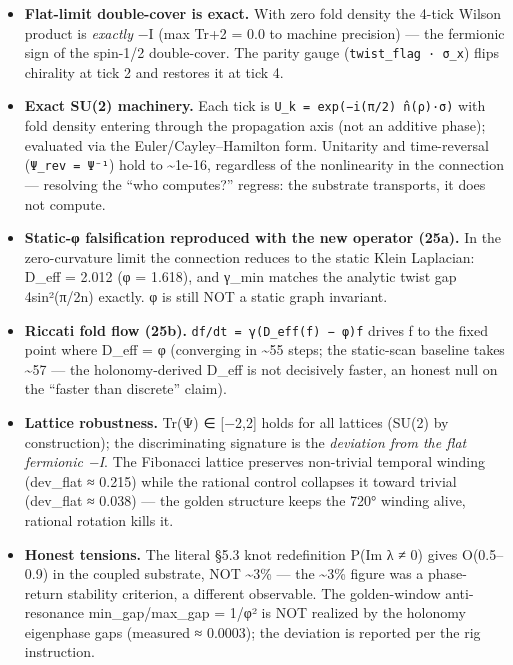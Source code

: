 \documentclass[
]{article}
\providecommand{\tightlist}{%
  \setlength{\itemsep}{0pt}\setlength{\parskip}{0pt}}
\begin{document}
\begin{itemize}
\tightlist
\item
  \textbf{Flat-limit double-cover is exact.} With zero fold density the
  4-tick Wilson product is \emph{exactly} −I (max
  \textbar Tr+2\textbar{} = 0.0 to machine precision) --- the fermionic
  sign of the spin-1/2 double-cover. The parity gauge
  (\texttt{twist\_flag\ ·\ σ\_x}) flips chirality at tick 2 and restores
  it at tick 4.
\item
  \textbf{Exact SU(2) machinery.} Each tick is
  \texttt{U\_k\ =\ exp(−i(π/2)\ n̂(ρ)·σ)} with fold density entering
  through the propagation axis (not an additive phase); evaluated via
  the Euler/Cayley--Hamilton form. Unitarity and time-reversal
  (\texttt{Ψ\_rev\ =\ Ψ⁻¹}) hold to \textasciitilde1e-16, regardless of
  the nonlinearity in the connection --- resolving the ``who computes?''
  regress: the substrate transports, it does not compute.
\item
  \textbf{Static-φ falsification reproduced with the new operator
  (25a).} In the zero-curvature limit the connection reduces to the
  static Klein Laplacian: D\_eff = 2.012 (φ = 1.618), and γ\_min matches
  the analytic twist gap 4sin²(π/2n) exactly. φ is still NOT a static
  graph invariant.
\item
  \textbf{Riccati fold flow (25b).}
  \texttt{df/dt\ =\ γ(D\_eff(f)\ −\ φ)f} drives f to the fixed point
  where D\_eff = φ (converging in \textasciitilde55 steps; the
  static-scan baseline takes \textasciitilde57 --- the holonomy-derived
  D\_eff is not decisively faster, an honest null on the ``faster than
  discrete'' claim).
\item
  \textbf{Lattice robustness.} Tr(Ψ) ∈ {[}−2,2{]} holds for all lattices
  (SU(2) by construction); the discriminating signature is the
  \emph{deviation from the flat fermionic −I}. The Fibonacci lattice
  preserves non-trivial temporal winding (dev\_flat ≈ 0.215) while the
  rational control collapses it toward trivial (dev\_flat ≈ 0.038) ---
  the golden structure keeps the 720° winding alive, rational rotation
  kills it.
\item
  \textbf{Honest tensions.} The literal §5.3 knot redefinition P(Im λ ≠
  0) gives O(0.5--0.9) in the coupled substrate, NOT \textasciitilde3\%
  --- the \textasciitilde3\% figure was a phase-return stability
  criterion, a different observable. The golden-window anti-resonance
  min\_gap/max\_gap = 1/φ² is NOT realized by the holonomy eigenphase
  gaps (measured ≈ 0.0003); the deviation is reported per the rig
  instruction.
\end{itemize}
\end{document}
